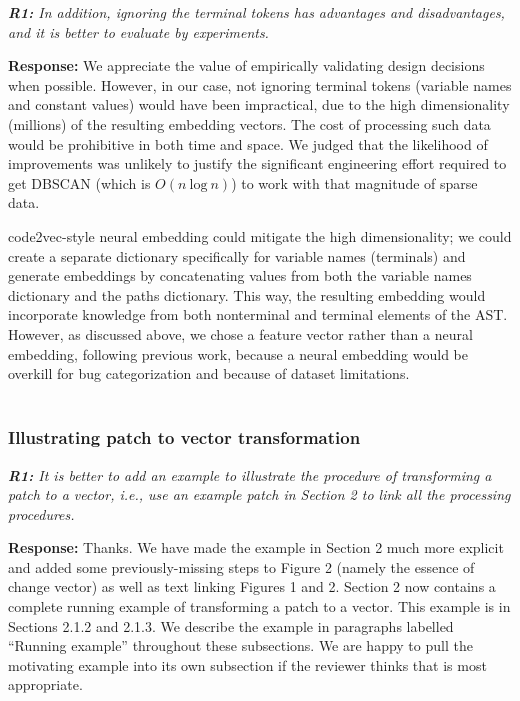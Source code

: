 \documentclass{article}
\begin{document}
\textit{\textbf{R1:} In addition, ignoring the terminal tokens has advantages and disadvantages, and it is better to evaluate by experiments. }

\vspace*{1em} \noindent \textbf{Response:} We appreciate the value of empirically validating design decisions when possible. However, in our case, not ignoring terminal tokens (variable names and constant values) would have been impractical, due to the high dimensionality (millions) of the resulting embedding vectors. The cost of processing such data would be prohibitive in both time and space. We judged that the likelihood of improvements was unlikely to justify the significant engineering effort required to get DBSCAN (which is $O(n~\mbox{log}~n)$) to work with that magnitude of sparse data.

code2vec-style neural embedding could mitigate the high dimensionality; we could create a separate dictionary specifically for variable names (terminals) and generate embeddings by concatenating values from both the variable names dictionary and the paths dictionary. This way, the resulting embedding would incorporate knowledge from both nonterminal and terminal elements of the AST. However, as discussed above, we chose a feature vector rather than a neural embedding, following previous work, because a neural embedding would be overkill for bug categorization and because of dataset limitations. \\ \\

\subsubsection{\label{rev:1:patch}Illustrating patch to vector transformation}

\textit{\textbf{R1:} It is better to add an example to illustrate the procedure of transforming a patch to a vector, i.e., use an example patch in Section 2 to link all the processing procedures.}

\vspace*{1em} \noindent \textbf{Response:} Thanks. We have made the example in Section 2 much more explicit and added some previously-missing steps to Figure 2 (namely the essence of change vector) as well as text linking Figures 1 and 2. Section 2 now contains a complete running example of transforming a patch to a vector. This example is in Sections 2.1.2 and 2.1.3. We describe the example in paragraphs labelled “Running example” throughout these subsections. We are happy to pull the motivating example into its own subsection if the reviewer thinks that is most appropriate. \\ \\
\end{document}
